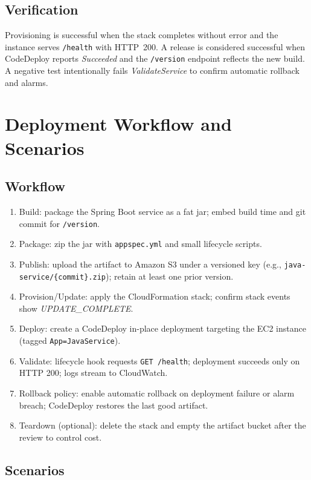 \documentclass[12pt]{article}
\begin{document}
\subsection{Verification}
Provisioning is successful when the stack completes without error and the instance serves \texttt{/health} with HTTP~200. A release is considered successful when CodeDeploy reports \emph{Succeeded} and the \texttt{/version} endpoint reflects the new build. A negative test intentionally fails \emph{ValidateService} to confirm automatic rollback and alarms.

\section{Deployment Workflow and Scenarios}\label{sec:workflow}

\subsection{Workflow}
\begin{enumerate}
\item Build: package the Spring Boot service as a fat jar; embed build time and git commit for \texttt{/version}.
\item Package: zip the jar with \texttt{appspec.yml} and small lifecycle scripts.
\item Publish: upload the artifact to Amazon S3 under a versioned key (e.g., \texttt{java-service/\{commit\}.zip}); retain at least one prior version.
\item Provision/Update: apply the CloudFormation stack; confirm stack events show \emph{UPDATE\_COMPLETE}.
\item Deploy: create a CodeDeploy in-place deployment targeting the EC2 instance (tagged \texttt{App=JavaService}).
\item Validate: lifecycle hook requests \texttt{GET /health}; deployment succeeds only on HTTP 200; logs stream to CloudWatch.
\item Rollback policy: enable automatic rollback on deployment failure or alarm breach; CodeDeploy restores the last good artifact.
\item Teardown (optional): delete the stack and empty the artifact bucket after the review to control cost.
\end{enumerate}

\subsection{Scenarios}
\end{document}
